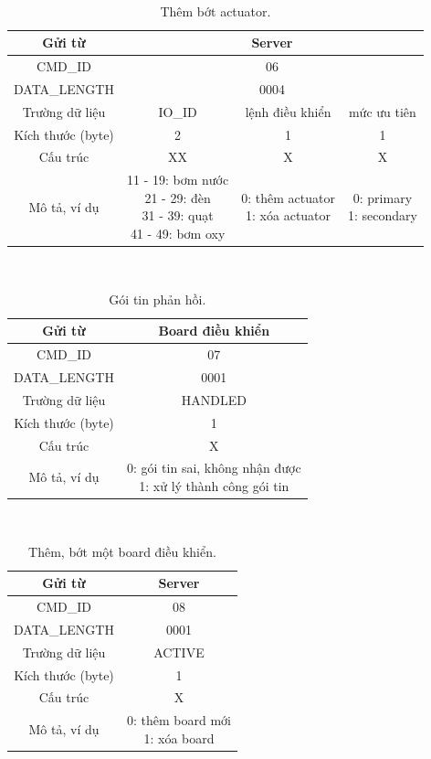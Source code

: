\documentclass[a4paper,12pt,oneside]{article}
\begin{document}
\noindent \\
\begin{table}[H]
\centering
\begin{tabular}{|c|c|c|c|}
\hline 
Gửi từ & \multicolumn{3}{c|}{Server} \\ 
\hline 
CMD\_ID & \multicolumn{3}{c|}{06} \\ 
\hline 
DATA\_LENGTH & \multicolumn{3}{c|}{0004} \\ 
\hline 
Trường dữ liệu & IO\_ID & lệnh điều khiển & mức ưu tiên \\ 
\hline 
Kích thước (byte) & 2 & 1 & 1 \\ 
\hline 
Cấu trúc & XX & X & X \\ 
\hline 
Mô tả, ví dụ & \makecell{11 - 19: bơm nước \\ 21 - 29: đèn \\ 31 - 39: quạt \\ 41 - 49: bơm oxy} & \makecell{0: thêm actuator \\ 1: xóa actuator} & \makecell{0: primary \\ 1: secondary} \\ 
\hline 
\end{tabular} 
\caption{Thêm bớt actuator.}
\end{table}
\noindent \\
\begin{table}[H]
\centering
\begin{tabular}{|c|c|}
\hline 
Gửi từ & Board điều khiển \\ 
\hline 
CMD\_ID & 07 \\ 
\hline 
DATA\_LENGTH & 0001 \\ 
\hline 
Trường dữ liệu & HANDLED \\ 
\hline 
Kích thước (byte) & 1 \\ 
\hline 
Cấu trúc & X \\ 
\hline 
Mô tả, ví dụ & \makecell{0: gói tin sai, không nhận được \\ 1: xử lý thành công gói tin} \\ 
\hline 
\end{tabular} 
    \caption{Gói tin phản hồi.}
\end{table}
\noindent \\
\begin{table}[H]
\centering
\begin{tabular}{|c|c|}
\hline 
Gửi từ & Server \\ 
\hline 
CMD\_ID & 08 \\ 
\hline 
DATA\_LENGTH & 0001 \\ 
\hline 
Trường dữ liệu & ACTIVE \\ 
\hline 
Kích thước (byte) & 1 \\ 
\hline 
Cấu trúc & X \\ 
\hline 
Mô tả, ví dụ & \makecell{0: thêm board mới \\ 1: xóa board} \\ 
\hline 
\end{tabular} 
\caption{Thêm, bớt một board điều khiển.}
\end{table}
\end{document}
